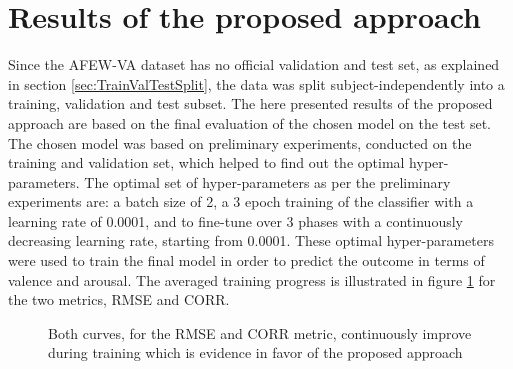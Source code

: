\section{Results of the proposed approach}
Since the AFEW-VA dataset has no official validation and test set, as explained in section \ref{sec:TrainValTestSplit}, the data was split subject-independently into a training, validation and test subset. The here presented results of the proposed approach are based on the final evaluation of the chosen model on the test set. The chosen model was based on preliminary experiments, conducted on the training and validation set, which helped to find out the optimal hyper-parameters.
\newline\newline
The optimal set of hyper-parameters as per the preliminary experiments are: a batch size of 2, a 3 epoch training of the classifier with a learning rate of 0.0001, and to fine-tune over 3 phases with a continuously decreasing learning rate, starting from 0.0001. These optimal hyper-parameters were used to train the final model in order to predict the outcome in terms of valence and arousal. The averaged training progress is illustrated in figure \ref{fig:LearningCurveResults} for the two metrics, RMSE and CORR.

\begin{figure}[H]
  \centering
  \hfill
  \caption{Both curves, for the RMSE and CORR metric, continuously improve during training which is evidence in favor of the proposed approach}
  \label{fig:LearningCurveResults}
\end{figure}

